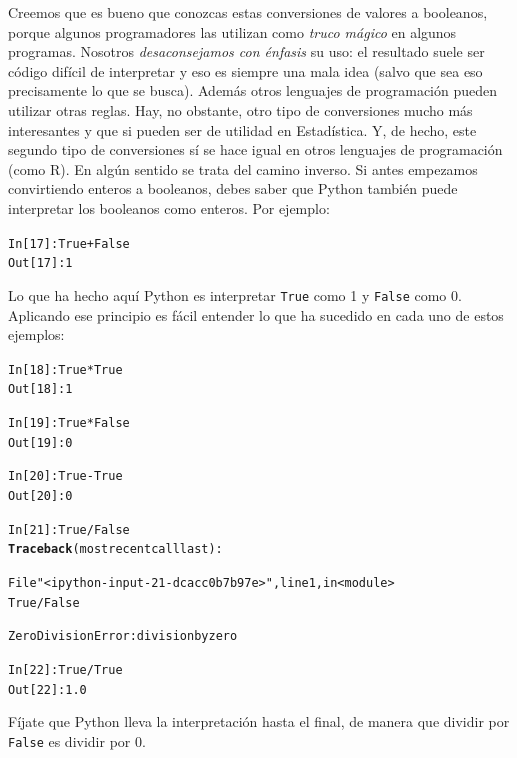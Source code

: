 \documentclass[10pt,a4paper]{article}\usepackage[]{graphicx}\usepackage[]{color}
\makeatletter
\newcommand{\hlnum}[1]{\textcolor[rgb]{0.686,0.059,0.569}{#1}}%
\newcommand{\hlstr}[1]{\textcolor[rgb]{0.192,0.494,0.8}{#1}}%
\newcommand{\hlopt}[1]{\textcolor[rgb]{0,0,0}{#1}}%
\newcommand{\hlstd}[1]{\textcolor[rgb]{0.345,0.345,0.345}{#1}}%
\newcommand{\hlkwd}[1]{\textcolor[rgb]{0.737,0.353,0.396}{\textbf{#1}}}%
\newenvironment{kframe}{%
 \def\at@end@of@kframe{}%
 \ifinner\ifhmode%
  \def\at@end@of@kframe{\end{minipage}}%
  \begin{minipage}{\columnwidth}%
 \fi\fi%
 \def\FrameCommand##1{\hskip\@totalleftmargin \hskip-\fboxsep
 \colorbox{shadecolor}{##1}\hskip-\fboxsep
     \hskip-\linewidth \hskip-\@totalleftmargin \hskip\columnwidth}%
 \MakeFramed {\advance\hsize-\width
   \@totalleftmargin\z@ \linewidth\hsize
   \@setminipage}}%
 {\par\unskip\endMakeFramed%
 \at@end@of@kframe}
\newenvironment{knitrout}{}{} %
\makeatother
\begin{document}
Creemos que es bueno que conozcas estas conversiones de valores a booleanos, porque  algunos programadores las utilizan como {\em truco mágico} en algunos programas. Nosotros {\em desaconsejamos con énfasis} su uso: el resultado suele ser código difícil de interpretar y eso es siempre una mala idea (salvo que sea eso precisamente lo que se busca). Además otros lenguajes de programación pueden utilizar otras reglas. Hay, no obstante, otro tipo de conversiones mucho más interesantes y que si pueden ser de utilidad en Estadística. Y, de hecho, este segundo tipo de conversiones sí se hace igual en otros lenguajes de programación (como R). En algún sentido se trata del camino inverso. Si antes empezamos convirtiendo enteros a booleanos, debes saber que Python también puede interpretar los booleanos como enteros. Por ejemplo:
\begin{knitrout}
\color{fgcolor}\begin{kframe}
\begin{alltt}
\hlstd{In [}\hlnum{17}\hlstd{]}\hlopt{:} \hlstd{True} \hlopt{+} \hlstd{False}
\hlstd{Out[}\hlnum{17}\hlstd{]}\hlopt{:} \hlnum{1}
\end{alltt}
\end{kframe}
\end{knitrout}
Lo que ha hecho aquí Python es interpretar {\tt True} como 1 y {\tt False} como 0. Aplicando ese principio es fácil entender lo que ha sucedido en cada uno de estos ejemplos:
\begin{knitrout}
\color{fgcolor}\begin{kframe}
\begin{alltt}
In [18]: True * True
Out[18]: 1

In [19]: True * False
Out[19]: 0

In [20]: True - True
Out[20]: 0

In [21]: True / False
\hlkwd{Traceback} (most recent call last):

  File \hlstr{"<ipython-input-21-dcacc0b7b97e>"}, line 1, in <module>
    True / False

ZeroDivisionError: division by zero


In [22]: True / True
Out[22]: 1.0
\end{alltt}
\end{kframe}
\end{knitrout}
Fíjate que Python lleva la interpretación hasta el final, de manera que dividir por {\tt False} es dividir por 0.
\end{document}
